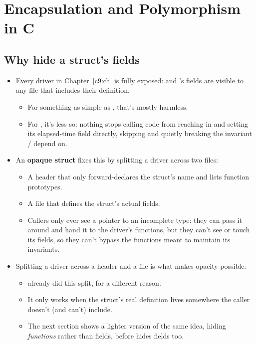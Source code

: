 
\section{Encapsulation and Polymorphism in C}
\label{c10:sec:encapsulation}\label{c10:app:a}

\subsection{Why hide a struct's fields}
\label{c10:a:1}
\begin{itemize}
  \item Every driver in Chapter~\ref{c9:ch} is fully exposed:  and 's
    fields are visible to any file that includes their definition.
  \begin{itemize}
    \item For something as simple as , that's mostly harmless.
    \item For , it's less so: nothing stops calling code from reaching in and setting
      its elapsed-time field directly, skipping  and quietly breaking the
      invariant / depend on.
  \end{itemize}
  \item An \textbf{opaque struct} fixes this by splitting a driver across two files:
  \begin{itemize}
    \item A header that only forward-declares the struct's name and lists function prototypes.
    \item A  file that defines the struct's actual fields.
    \item Callers only ever see a pointer to an incomplete type: they can pass it around and hand
      it to the driver's functions, but they can't see or touch its fields, so they can't bypass
      the functions meant to maintain its invariants.
  \end{itemize}
  \item Splitting a driver across a header and a  file is what makes opacity possible:
  \begin{itemize}
    \item {} already did this split, for a different reason.
    \item It only works when the struct's real definition lives somewhere the caller doesn't (and
      can't) include.
    \item The next section shows a lighter version of the same idea, hiding \emph{functions}
      rather than fields, before  hides fields too.
  \end{itemize}
\end{itemize}

